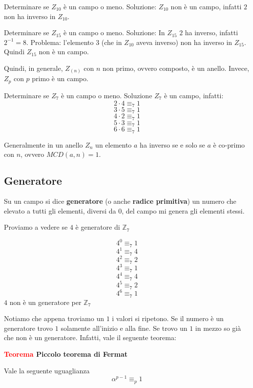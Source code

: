 \documentclass[12pt]{report}
\begin{document}
    \begin{es}
        Determinare se $Z_{10}$ è un campo o meno. Soluzione: $Z_{10}$ non è un campo, infatti $2$ non ha inverso in $Z_{10}$.
    \end{es}

    \begin{es}
        Determinare se $Z_{15}$ è un campo o meno. Soluzione: In $Z_{15}$ $2$  ha inverso, infatti $2^{-1} = 8$. Problema: l'elemento $3$ (che in $Z_{10}$ aveva inverso) non ha inverso in $Z_{15}$. Quindi $Z_{15}$ non è un campo.
    \end{es}
    Quindi, in generale, $Z_{(n)}$ con $n$ non primo, ovvero composto, è un anello. Invece, $Z_p$ con $p$ primo è un campo.

    \begin{es}
        Determinare se $Z_7$ è un campo o meno. Soluzione $Z_7$ è un campo, infatti:
        $$2 \cdot 4 \equiv_7 1$$
        $$3 \cdot 5 \equiv_7 1$$
        $$4 \cdot 2 \equiv_7 1$$
        $$5 \cdot 3 \equiv_7 1$$
        $$6 \cdot 6 \equiv_7 1$$
    \end{es}

    \noindent
    Generalmente in un anello $Z_n$ un elemento $a$ ha inverso se e solo se $a$ è co-primo con $n$, ovvero $MCD(a,n) = 1$.


    \subsection{Generatore}
    Su un campo si dice \textbf{generatore} (o anche \textbf{radice primitiva}) un numero che elevato a tutti gli elementi, diversi da $0$, del campo mi genera gli elementi stessi.

    \begin{exmp}
        Proviamo a vedere se $4$ è generatore di $\mathbb{Z}_7$

        $$4^0  \equiv_7 1 $$
        $$4^1  \equiv_7 4 $$
        $$4^2  \equiv_7 2 $$
        $$4^3  \equiv_7 1 $$
        $$4^4  \equiv_7 4 $$
        $$4^5  \equiv_7 2 $$
        $$4^6  \equiv_7 1 $$
        $4$ non è un generatore per $\mathbb{Z}_7$
    \end{exmp}

    \noindent
    Notiamo che appena troviamo un $1$ i valori si ripetono. Se il numero è un generatore trovo $1$ solamente all'inizio e alla fine. Se trovo un $1$ in mezzo so già che non è un generatore. Infatti, vale il seguente teorema:

    \vspace{5px}
    \begin{tcolorbox}
        \textbf{\textcolor{red}{Teorema} Piccolo teorema di Fermat }
        \vspace{5px}
        \begin{center}

            Vale la seguente uguaglianza
            $$\alpha^{p-1} \equiv_p 1$$

        \end{center}
    \end{tcolorbox}
\end{document}

